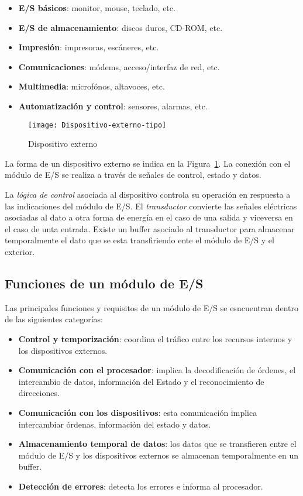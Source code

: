 \begin{itemize}
  \item \textbf{E/S básicos}: monitor, mouse, teclado, etc.
  \item \textbf{E/S de almacenamiento}: discos duros, CD-ROM, etc.
  \item \textbf{Impresión}: impresoras, escáneres, etc.
  \item \textbf{Comunicaciones}: módems, acceso/interfaz de red, etc.
  \item \textbf{Multimedia}: microfónos, altavoces, etc.
  \item \textbf{Automatización y control}: sensores, alarmas, etc.
\end{itemize}

\begin{figure}[H]
  \centering
  \texttt{[image: Dispositivo-externo-tipo]}
  \caption{Dispositivo externo}\label{fig:Dispositivo-externo-tipo}
\end{figure}

La forma de un dispositivo externo se indica en la Figura~\ref{fig:Dispositivo-externo-tipo}. La conexión con el módulo de E/S se realiza a través de señales de control, estado y datos.

La \textit{lógica de control} asociada al dispositivo controla su operación en respuesta a las indicaciones del módulo de E/S. El \textit{transductor} convierte las señales eléctricas asociadas al dato a otra forma de energía en el caso de una salida y viceversa en el caso de unta entrada. Existe un buffer asociado al transductor para almacenar temporalmente el dato que se esta transfiriendo ente el módulo de E/S y el exterior.

\subsection{Funciones de un módulo de E/S}

Las principales funciones y requisitos de un módulo de E/S se esncuentran dentro de las siguientes categorías:

\begin{itemize}
  \item \textbf{Control y temporización}: coordina el tráfico entre los recursos internos y los dispositivos externos.
  \item \textbf{Comunicación con el procesador}: implica la decodificación de órdenes, el intercambio de datos, información del Estado y el reconocimiento de direcciones.
  \item \textbf{Comunicación con los dispositivos}: esta comunicación implica intercambiar órdenas, información del estado y datos.
  \item \textbf{Almacenamiento temporal de datos}: los datos que se transfieren entre el módulo de E/S y los dispositivos externos se almacenan temporalmente en un buffer.
  \item \textbf{Detección de errores}: detecta los errores e informa al procesador.
\end{itemize}

